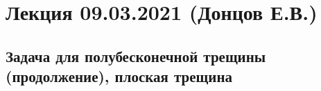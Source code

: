\documentclass[main.tex]{subfiles}
\begin{document}

\section{Лекция 09.03.2021 (Донцов Е.В.)}

\subsection{Задача для полубесконечной трещины (продолжение), плоская трещина}
\end{document}
